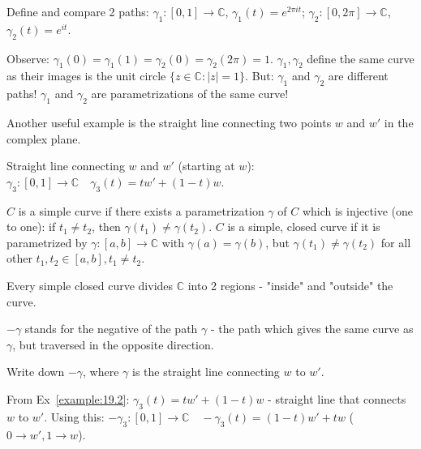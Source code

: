 \begin{example} \label{example:19.1} Define and compare 2 paths: $\gamma_1: [0, 1] \to \mathbb{C}$, $\gamma_1(t) = e^{2\pi i t}$; $\gamma_2: [0, 2\pi] \to \mathbb{C}$, $\gamma_2(t) = e^{it}$.

Observe: $\gamma_1(0) = \gamma_1(1) = \gamma_2(0) = \gamma_2(2\pi) = 1$. $\gamma_1, \gamma_2$ define the same curve as their images is the unit circle $\{z \in \mathbb{C}: |z| = 1\}$. But: $\gamma_1$ and $\gamma_2$ are different paths! $\gamma_1$ and $\gamma_2$ are parametrizations of the same curve!
\end{example}

\begin{example} \label{example:19.2} Another useful example is the straight line connecting two points $w$ and $w'$ in the complex plane.

Straight line connecting $w$ and $w'$ (starting at $w$): $\gamma_3: [0, 1] \to \mathbb{C} \quad \gamma_3(t) = tw' + (1-t)w$.
\end{example}

\begin{definition} \label{definition:17.2} $C$ is a simple curve if there exists a 
    parametrization $\gamma$ of $C$ which is injective (one to one): if $t_1 \neq t_2$, then $\gamma(t_1) \neq \gamma(t_2)$. 
    $C$ is a simple, closed curve if it is parametrized by $\gamma: [a, b] \to \mathbb{C}$ with $\gamma(a) = \gamma(b)$, but $\gamma(t_1) \neq \gamma(t_2)$ for all other $t_1, t_2 \in [a, b], t_1 \neq t_2$.
\end{definition}
\begin{theorem} \label{theorem:jordan}
    Every simple closed curve divides $\mathbb{C}$ into 2 regions - "inside" and "outside" the curve.
\end{theorem}

 $-\gamma$ stands for the negative of the path $\gamma$ - the path which 
gives the same curve as $\gamma$, but traversed in the opposite direction.

\begin{example} \label{example:19.3} Write down $-\gamma$, where $\gamma$ is the straight line connecting $w$ to $w'$.
\begin{soln}
    From Ex~\ref{example:19.2}: $\gamma_3(t) = tw' + (1-t)w$ - straight line that 
    connects $w$ to $w'$. Using this: $-\gamma_3: [0, 1] \to \mathbb{C} \quad -\gamma_3(t) = (1-t)w' + tw$ ($0 \to w', 1 \to w$).
\end{soln}
\end{example}

